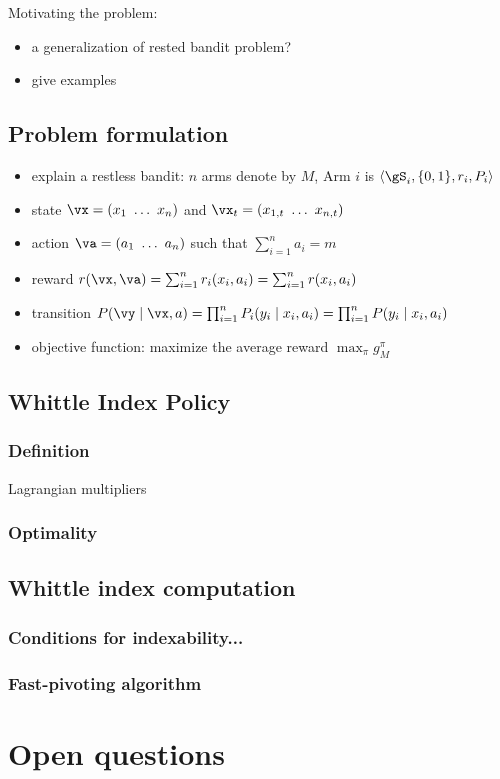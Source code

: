 Motivating the problem:
\begin{itemize}
    \item a generalization of rested bandit problem?
    \item give examples
\end{itemize}

\subsection{Problem formulation}
\label{subsec:restless_pb_formul}

\begin{itemize}
    \item explain a restless bandit: $n$ arms denote by $M$, Arm $i$ is $\langle\gS_i, \{0,1\}, r_i,P_i\rangle$
    \item state $\vx=(x_1\ \dots\ x_n)$ and $\vx_t=(x_{1,t}\ \dots\ x_{n,t})$
    \item action $\va=(a_1\ \dots\ a_n)$ such that $\sum_{i=1}^{n}a_i =m$
    \item reward $r(\vx, \va)=\sum_{i=1}^n r_i(x_i,a_i) =\sum_{i=1}^n r(x_i,a_i)$
    \item transition $P(\vy \mid\vx,a)=\prod_{i=1}^nP_i(y_i \mid x_i,a_i)=\prod_{i=1}^n P(y_i \mid x_i,a_i)$
    \item objective function: maximize the average reward $\max_{\pi}g^\pi_M$ 
\end{itemize}


\subsection{Whittle Index Policy}
\label{subsec:whittle_idx}

\subsubsection{Definition}

Lagrangian multipliers

\subsubsection{Optimality}

\subsection{Whittle index computation}

\subsubsection{Conditions for indexability...}

\subsubsection{Fast-pivoting algorithm}


\section{Open questions}

\endgroup
